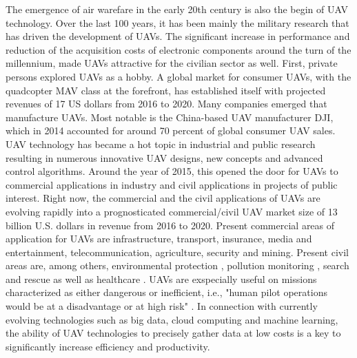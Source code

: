 The emergence of air warefare in the early 20th century is also the begin of UAV technology.
Over the last 100 years, it has been mainly the military research that has driven the development of UAVs. \cite{Sifton2012}
The significant increase in performance and reduction of the acquisition costs of electronic components around the turn of the millennium,
made UAVs attractive for the civilian sector as well. \cite{Garcia2019} \cite{Chao2010}
First, private persons explored UAVs as a hobby. 
A global market for consumer UAVs, with the quadcopter MAV class at the forefront, 
has established itself with projected revenues of 17 US dollars from 2016 to 2020. \cite{Goldman}
Many companies emerged that manufacture UAVs. 
Most notable is the China-based UAV manufacturer DJI, which in 2014 accounted for around 70 percent of global consumer UAV sales. \cite{Weinswig2015}
UAV technology has became a hot topic in industrial and public research
resulting in numerous innovative UAV designs, new concepts and advanced control algorithms. \cite{Desjardins2016}
Around the year of 2015, this opened the door for UAVs to commercial applications in industry and civil applications in projects of public interest.
Right now, the commercial and the civil applications of UAVs are evolving rapidly 
into a prognosticated commercial/civil UAV market size of 13 billion U.S. dollars in revenue from 2016 to 2020. \cite{Goldman}
Present commercial areas of application for UAVs are
infrastructure, transport, insurance, media and entertainment, telecommunication, agriculture, security and mining. \cite{PwC2016}
Present civil areas are, among others, environmental protection \cite{Lei2019}, pollution monitoring \cite{Xiang2019}, 
search and rescue \cite{McCarthy2018} as well as healthcare \cite{PeoplesDaily2019}.
UAVs are exspecially useful on missions characterized as either dangerous or inefficient, 
i.e., "human pilot operations would be at a disadvantage or at high risk" \cite{Watts2012}.
In connection with currently evolving technologies such as big data, cloud computing and machine learning,
the ability of UAV technologies to precisely gather data at low costs is a key to significantly increase efficiency and productivity. \cite{Garcia2019}

